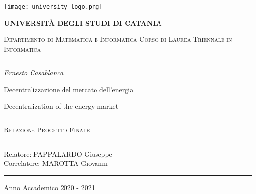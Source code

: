 \begin{titlepage}
    \centering 
    \texttt{[image: university\_logo.png]}

    \bigskip

    {\Large \textbf{UNIVERSIT\`A DEGLI STUDI DI CATANIA}}

    {\scshape
        \large
        Dipartimento di Matematica e Informatica
    }
    {\scshape
        \normalsize
        Corso di Laurea Triennale in Informatica
    }

    \bigskip

    \hrule

    \bigskip
    \bigskip
    \bigskip
    \bigskip

    {\itshape
        \large
        Ernesto Casablanca
        \par}

    \bigskip
    \bigskip
    \bigskip
    \bigskip

    {\centering
        \Large
        Decentralizzazione del mercato dell'energia
        \par}
    {\centering
        Decentralization of the energy market
        \par}

    \bigskip
    \bigskip
    \bigskip
    \bigskip
    \bigskip
    \bigskip

    \begin{minipage}[b]{8 cm}
        \hrule
        \bigskip
        {\centering\scshape
            Relazione Progetto Finale
            \par}
        \bigskip
        \hrule
    \end{minipage}

    \bigskip
    \bigskip
    \bigskip
    \bigskip
    \bigskip
    \bigskip
    \bigskip
    \bigskip
    \bigskip
    \bigskip
    \bigskip

    {\raggedleft
        Relatore: PAPPALARDO Giuseppe \\
        Correlatore: MAROTTA Giovanni
        \par}

    \bigskip
    \bigskip
    \bigskip
    \bigskip

    \hrule

    \bigskip

    {\centering
        Anno Accademico 2020 - 2021
        \par}

\end{titlepage}
